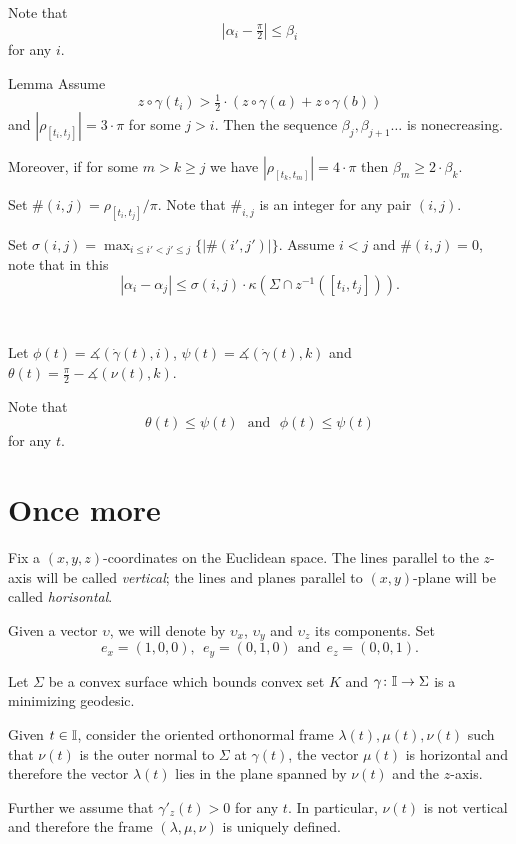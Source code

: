 \documentclass[a4paper,10pt]{amsart}
\begin{document}
Note that 
\[|\alpha_i-\tfrac\pi2|\le \beta_i\]
for any $i$.



\begin{thm}{Lemma}
Assume \[z\circ\gamma(t_i)>\tfrac12\cdot(z\circ\gamma(a)+z\circ\gamma(b))\]
and $|\rho_{[t_i,t_j]}|=3\cdot \pi$ for some $j>i$.
Then the sequence $\beta_j,\beta_{j+1}\dots$ is nonecreasing.

Moreover, if for some $m>k\ge j$ we have $|\rho_{[t_k,t_m]}|=4\cdot \pi$ then 
$\beta_m\ge 2\cdot \beta_k$.
\end{thm}

Set $\#(i,j)=\rho_{[t_i,t_j]}/\pi$.
Note that $\#_{i,j}$ is an integer for any pair $(i,j)$.

Set $\sigma(i,j)=\max_{i\le i'<j'\le j}\{|\#(i',j')|\}$.
Assume $i<j$ and $\#(i,j)=0$, note that in this 
\[|\alpha_i-\alpha_j|\le \sigma(i,j)\cdot\kappa(\Sigma\cap z^{-1}([t_i,t_j])).\]

\ 
 
Let $\phi(t)=\measuredangle(\dot\gamma(t),i)$, 
$\psi(t)=\measuredangle(\dot\gamma(t),k)$ 
and $\theta(t)=\tfrac\pi2-\measuredangle(\nu(t),k)$.

Note that 
\[\theta(t)\le \psi(t)
\ \ \ 
\text{and}
\ \ \ 
\phi(t)\le \psi(t)\] 
for any $t$.


\section{Once more}

Fix a $(x,y,z)$-coordinates on the Euclidean space.
The lines parallel to the $z$-axis will be called \emph{vertical};
the lines and planes parallel to $(x,y)$-plane will be called \emph{horisontal}.

Given a vector $\upsilon$, we will denote by $\upsilon_x$, $\upsilon_y$ and $\upsilon_z$ its components.
Set 
\[e_x=(1,0,0),\ \ e_y=(0,1,0)\ \ \text{and}\ \ e_z=(0,0,1).\]

Let $\Sigma$ be a convex surface which bounds convex set $K$
and $\gamma\colon\mathbb{I}\to \Sigma$ is a minimizing geodesic.

Given $t\in \mathbb{I}$, 
consider the oriented orthonormal frame $\lambda(t),\mu(t),\nu(t)$ 
such that $\nu(t)$ is the outer normal to $\Sigma$ at $\gamma(t)$,
the vector $\mu(t)$ is horizontal and therefore the vector $\lambda(t)$ lies in the plane spanned by $\nu(t)$ and the $z$-axis.

Further we assume that $\gamma'_z(t)>0$ for any $t$.
In particular, $\nu(t)$ is not vertical and therefore
the frame $(\lambda,\mu,\nu)$ is uniquely defined.
\end{document}
